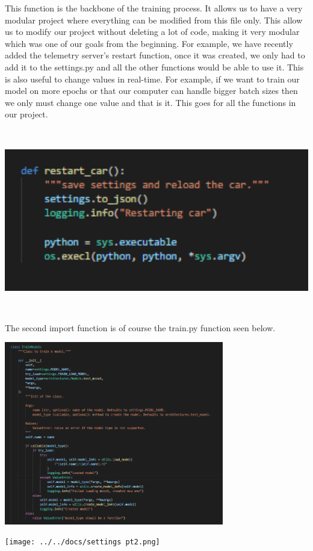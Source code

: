 \documentclass[12pt]{article}
\begin{document}
This function is the backbone of the training process. It allows us to have a very modular project where everything can be modified from this file only. This allow us to modify our project without deleting a lot of code, making it very modular which was one of our goals from the beginning. For example, we have recently added the telemetry server's restart function, once it was created, we only had to add it to the settings.py and all the other functions would be able to use it.   
This is also useful to change values in real-time. For example, if we want to train our model on more epochs or that our computer can handle bigger batch sizes then we only must change one value and that is it. This goes for all the functions in our project. 
\centerline{\includegraphics[height=8cm]{../../docs/restart settings.png}}

The second import function is of course the train.py function seen below. 
\centerline{\includegraphics[height=8cm]{../../docs/trainpt1.png}}
\centerline{\texttt{[image: ../../docs/settings pt2.png]}}
\end{document}
